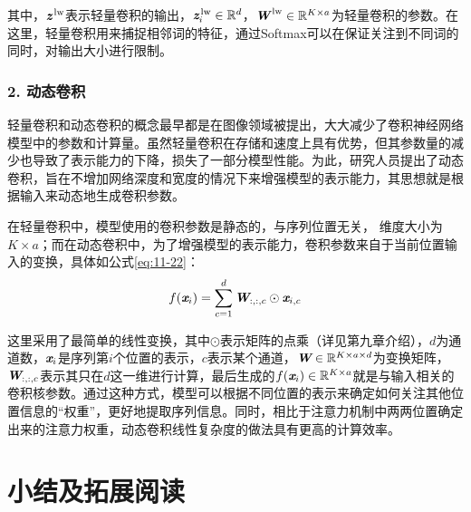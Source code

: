 \noindent 其中，$\textbf{\em z}^\textrm{\,lw}$表示轻量卷积的输出，$\textbf{\em z}_i^\textrm{\,lw} \in \mathbb{R}^d $，$\textbf{\em W}^\textrm{\,lw} \in \mathbb{R}^{K\times a}$为轻量卷积的参数。在这里，轻量卷积用来捕捉相邻词的特征，通过Softmax可以在保证关注到不同词的同时，对输出大小进行限制。

\subsubsection{2. 动态卷积}

\parinterval 轻量卷积和动态卷积的概念最早都是在图像领域被提出，大大减少了卷积神经网络模型中的参数和计算量。虽然轻量卷积在存储和速度上具有优势，但其参数量的减少也导致了表示能力的下降，损失了一部分模型性能。为此，研究人员提出了动态卷积，旨在不增加网络深度和宽度的情况下来增强模型的表示能力，其思想就是根据输入来动态地生成卷积参数。

\parinterval 在轻量卷积中，模型使用的卷积参数是静态的，与序列位置无关， 维度大小为$K\times a$；而在动态卷积中，为了增强模型的表示能力，卷积参数来自于当前位置输入的变换，具体如公式\eqref{eq:11-22}：
\begin{eqnarray}
{f} (\textbf{\em x}_{i}) = \sum_{c=1}^d \textbf{\em W}_{:,:,c} \odot \textbf{\em x}_{i,c}
\label{eq:11-22}
\end{eqnarray}

\parinterval 这里采用了最简单的线性变换，其中$\odot$表示矩阵的点乘（详见第九章介绍），$d$为通道数，$\textbf{\em x}_i$是序列第$i$个位置的表示，$c$表示某个通道，$\textbf{\em W} \in \mathbb{R}^{K \times a \times d}$为变换矩阵，$\textbf{\em W}_{:,:,c}$表示其只在$d$这一维进行计算，最后生成的${f} (\textbf{\em x}_i)\in \mathbb{R}^{K \times a}$就是与输入相关的卷积核参数。通过这种方式，模型可以根据不同位置的表示来确定如何关注其他位置信息的“权重”，更好地提取序列信息。同时，相比于注意力机制中两两位置确定出来的注意力权重，动态卷积线性复杂度的做法具有更高的计算效率。

\sectionnewpage
\section{小结及拓展阅读}

